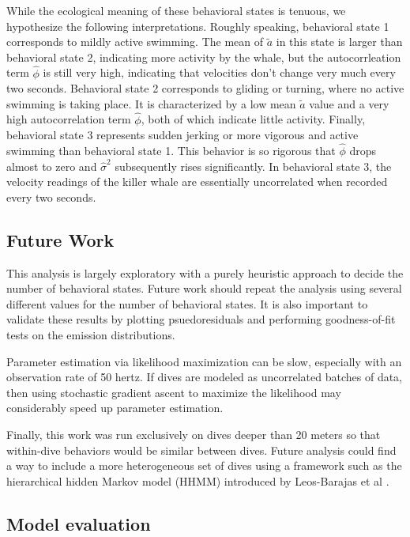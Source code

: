 While the ecological meaning of these behavioral states is tenuous, we hypothesize the following interpretations. Roughly speaking, behavioral state 1 corresponds to mildly active swimming. The mean of $\tilde a$ in this state is larger than behavioral state 2, indicating more activity by the whale, but the autocorrleation term $\hat \phi$ is still very high, indicating that velocities don't change very much every two seconds. Behavioral state 2 corresponds to gliding or turning, where no active swimming is taking place. It is characterized by a low mean $\tilde a$ value and a very high autocorrelation term $\hat \phi$, both of which indicate little activity. Finally, behavioral state 3 represents sudden jerking or more vigorous and active swimming than behavioral state 1. This behavior is so rigorous that $\hat \phi$ drops almost to zero and $\hat \sigma^2$ subsequently rises significantly. In behavioral state 3, the velocity readings of the killer whale are essentially uncorrelated when recorded every two seconds.

\subsection{Future Work}

This analysis is largely exploratory with a purely heuristic approach to decide the number of behavioral states. Future work should repeat the analysis using several different values for the number of behavioral states. It is also important to validate these results by plotting psuedoresiduals and performing goodness-of-fit tests on the emission distributions.

Parameter estimation via likelihood maximization can be slow, especially with an observation rate of 50 hertz. If dives are modeled as uncorrelated batches of data, then using stochastic gradient ascent to maximize the likelihood may considerably speed up parameter estimation.

Finally, this work was run exclusively on dives deeper than 20 meters so that within-dive behaviors would be similar between dives. Future analysis could find a way to include a more heterogeneous set of dives using a framework such as the hierarchical hidden Markov model (HHMM) introduced by Leos-Barajas et al \cite{Barajas:2017}.

\subsection{Model evaluation}

